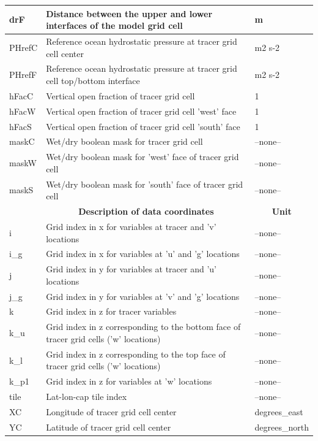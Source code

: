 \begin{longtable}{|m{}|m{}|m{}|}
drF &Distance between the upper and lower interfaces of the model grid cell &m  \\ \hline
PHrefC &Reference ocean hydrostatic pressure at tracer grid cell center &m2 s-2  \\ \hline
PHrefF &Reference ocean hydrostatic pressure at tracer grid cell top/bottom interface &m2 s-2  \\ \hline
hFacC &Vertical open fraction of tracer grid cell &1  \\ \hline
hFacW &Vertical open fraction of tracer grid cell 'west' face &1  \\ \hline
hFacS &Vertical open fraction of tracer grid cell 'south' face &1  \\ \hline
maskC &Wet/dry boolean mask for tracer grid cell &--none--  \\ \hline
maskW &Wet/dry boolean mask for 'west' face of tracer grid cell &--none--  \\ \hline
maskS &Wet/dry boolean mask for 'south' face of tracer grid cell &--none--  \\ \hline
\rowcolor{lightgray} \multicolumn{1}{|c|}{\textbf{Coordinates}} & \multicolumn{1}{|c|}{\textbf{Description of data coordinates}} &  \multicolumn{1}{|c|}{\textbf{Unit}}\\ \hline
i &Grid index in x for variables at tracer and 'v' locations &--none--  \\ \hline
i\_g &Grid index in x for variables at 'u' and 'g' locations &--none--  \\ \hline
j &Grid index in y for variables at tracer and 'u' locations &--none--  \\ \hline
j\_g &Grid index in y for variables at 'v' and 'g' locations &--none--  \\ \hline
k &Grid index in z for tracer variables &--none--  \\ \hline
k\_u &Grid index in z corresponding to the bottom face of tracer grid cells ('w' locations) &--none--  \\ \hline
k\_l &Grid index in z corresponding to the top face of tracer grid cells ('w' locations) &--none--  \\ \hline
k\_p1 &Grid index in z for variables at 'w' locations &--none--  \\ \hline
tile &Lat-lon-cap tile index &--none--  \\ \hline
XC &Longitude of tracer grid cell center &degrees\_east  \\ \hline
YC &Latitude of tracer grid cell center &degrees\_north  \\ \hline

\end{longtable}
